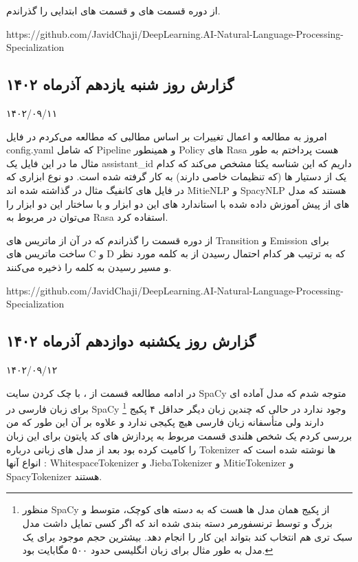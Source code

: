 از دوره  قسمت های  و قسمت های ابتدایی  را گذراندم.

https://github.com/JavidChaji/DeepLearning.AI-Natural-Language-Processing-Specialization


\subsection{گزارش روز شنبه یازدهم آذر‌ماه ۱۴۰۲}

۱۴۰۲/۰۹/۱۱

امروز به مطالعه  و اعمال تغییرات بر اساس مطالبی که مطالعه می‌کردم در فایل config.yaml که شامل Pipeline و همینطور Policy های Rasa هست پرداختم
به طور مثال ما در این فایل یک assistant\_id داریم که این شناسه یکتا مشخص می‌کند که کدام یک از دستیار ها (که تنظیمات  خاصی دارند) به کار گرفته شده است.
دو نوع ابزاری که در فایل های کانفیگ مثال در  گذاشته شده اند MitieNLP و SpacyNLP هستند که مدل های از پیش آموزش داده شده با استاندارد های این دو ابزار و با ساختار این دو ابزار را می‌توان در  مربوط به Rasa استفاده کرد.

از دوره  قسمت  را گذراندم که در آن از ماتریس های Transition و Emission برای ساخت ماتریس های C و D که به ترتیب هر کدام احتمال رسیدن از  به کلمه مورد نظر و مسیر رسیدن به کلمه را ذخیره می‌کنند.

https://github.com/JavidChaji/DeepLearning.AI-Natural-Language-Processing-Specialization


\subsection{گزارش روز یکشنبه دوازدهم آذر‌ماه ۱۴۰۲}

۱۴۰۲/۰۹/۱۲

در ادامه مطالعه قسمت  از ، با چک کردن سایت SpaCy متوجه شدم که مدل آماده ای برای زبان فارسی در SpaCy وجود ندارد در حالی که چندین زبان دیگر حداقل ۴ پکیج \footnote{منظور SpaCy از پکیج همان مدل ها هست که به دسته های کوچک، متوسط و بزرگ و توسط ترنسفورمر دسته بندی شده اند که اگر کسی تمایل داشت مدل سبک تری هم انتخاب کند بتواند این کار را انجام دهد. بیشترین حجم موجود برای یک مدل به طور مثال برای زبان انگلیسی حدود ۵۰۰ مگابایت بود.} دارند ولی متأسفانه زبان فارسی هیچ پکیجی ندارد و علاوه بر آن این طور که من بررسی کردم یک شخص هلندی قسمت مربوط به پردازش های کد پایتون برای این زبان را کامیت کرده بود
بعد از مدل های زبانی درباره Tokenizer ها نوشته شده است که انواع آنها : WhitespaceTokenizer و JiebaTokenizer و MitieTokenizer و SpacyTokenizer هستند.


